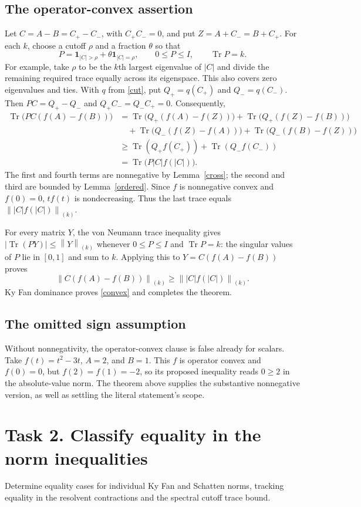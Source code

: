 \documentclass[11pt]{article}
\newcommand{\Tr}{\operatorname{Tr}}
\newcommand{\nn}[1]{\left\lVert#1\right\rVert}
\begin{document}
\subsection*{The operator-convex assertion}
Let $C=A-B=C_+-C_-$, with $C_+C_-=0$, and put
$Z=A+C_-=B+C_+$. For each $k$, choose a cutoff $\rho$ and a
fraction $\theta$ so that
\[
 P=\mathbf1_{|C|>\rho}+\theta\mathbf1_{|C|=\rho},
 \qquad 0\leq P\leq I,\qquad\Tr P=k.
\]
For example, take $\rho$ to be the $k$th largest eigenvalue of
$|C|$ and divide the remaining required trace equally across its
eigenspace. This also covers zero eigenvalues and ties.
With $q$ from \eqref{cut}, put $Q_+=q(C_+)$ and $Q_-=q(C_-)$.
Then $PC=Q_+-Q_-$ and $Q_+C_-=Q_-C_+=0$. Consequently,
\begin{align*}
 \Tr\bigl(PC(f(A)-f(B))\bigr)
 &=\Tr\bigl(Q_+(f(A)-f(Z))\bigr)
   +\Tr\bigl(Q_+(f(Z)-f(B))\bigr)\\
 &\quad+\Tr\bigl(Q_-(f(Z)-f(A))\bigr)
   +\Tr\bigl(Q_-(f(B)-f(Z))\bigr)\\
 &\geq\Tr(Q_+f(C_+))+\Tr(Q_-f(C_-))\\
 &=\Tr\bigl(P|C|f(|C|)\bigr).
\end{align*}
The first and fourth terms are nonnegative by
Lemma~\ref{cross}; the second and third are bounded by
Lemma~\ref{ordered}. Since $f$ is nonnegative convex and
$f(0)=0$, $tf(t)$ is nondecreasing. Thus the last trace equals
$\nn{|C|f(|C|)}_{(k)}$.

For every matrix $Y$, the von Neumann trace inequality gives
$|\Tr(PY)|\leq\nn{Y}_{(k)}$ whenever $0\leq P\leq I$ and
$\Tr P=k$: the singular values of $P$ lie in $[0,1]$ and sum
to $k$. Applying this to $Y=C(f(A)-f(B))$ proves
\[
 \nn{C(f(A)-f(B))}_{(k)}\geq\nn{|C|f(|C|)}_{(k)}.
\]
Ky Fan dominance proves \eqref{convex} and completes the theorem.

\subsection*{The omitted sign assumption}
Without nonnegativity, the operator-convex clause is false already
for scalars. Take $f(t)=t^2-3t$, $A=2$, and $B=1$. This $f$ is
operator convex and $f(0)=0$, but $f(2)=f(1)=-2$, so its proposed
inequality reads $0\geq2$ in the absolute-value norm.
The theorem above supplies the substantive nonnegative version,
as well as settling the literal statement's scope.

\section*{Task 2. Classify equality in the norm inequalities}
Determine equality cases for individual Ky Fan and Schatten norms,
tracking equality in the resolvent contractions and the spectral
cutoff trace bound.
\end{document}
